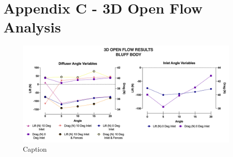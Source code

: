 \newpage
\flushleft
\section*{Appendix C - 3D Open Flow Analysis} 

\begin{figure}
    \centering
    \includegraphics[scale=0.5]{Figures/Graph/3D_OF.png}
    \caption{Caption}
    \label{fig:my_label}
\end{figure}